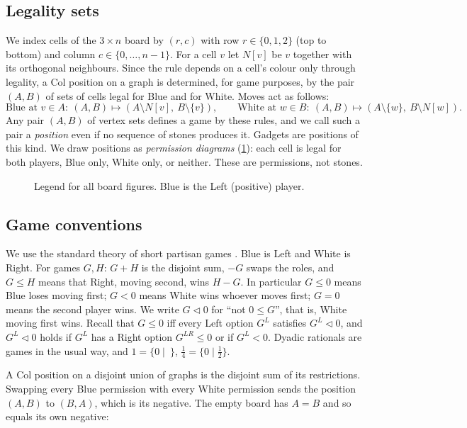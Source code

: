 \documentclass[11pt]{amsart}
\theoremstyle{definition}
\newcommand{\Nb}{N}
\newcommand{\lf}{\mathrel{\triangleleft}}
\begin{document}
\subsection{Legality sets}
We index cells of the $3\times n$ board by $(r,c)$ with row $r\in\{0,1,2\}$
(top to bottom) and column $c\in\{0,\dots,n-1\}$. For a cell $v$ let $\Nb[v]$
be $v$ together with its orthogonal neighbours. Since the rule depends on a
cell's colour only through legality, a Col position on a graph is determined,
for game purposes, by the pair $(A,B)$ of sets of cells legal for Blue and for
White. Moves act as follows:
\[
\text{Blue at }v\in A:\ (A,B)\mapsto (A\setminus \Nb[v],\ B\setminus\{v\}),\qquad
\text{White at }w\in B:\ (A,B)\mapsto (A\setminus\{w\},\ B\setminus \Nb[w]).
\]
Any pair $(A,B)$ of vertex sets defines a game by these rules, and we call such
a pair a \emph{position} even if no sequence of stones produces it. Gadgets are
positions of this kind. We draw positions as \emph{permission diagrams}
(\cref{fig:legend}): each cell is legal for both players, Blue only, White
only, or neither. These are permissions, not stones.

\begin{figure}[ht]
\centering
{}
\caption{Legend for all board figures. Blue is the Left (positive) player.}
\label{fig:legend}
\end{figure}

\subsection{Game conventions}
We use the standard theory of short partisan games \cite{ONAG,Siegel}. Blue is
Left and White is Right. For games $G,H$: $G+H$ is the disjoint sum, $-G$
swaps the roles, and $G\le H$ means that Right, moving second, wins $H-G$.
In particular $G\le0$ means Blue loses moving first; $G<0$ means White wins
whoever moves first; $G=0$ means the second player wins. We write
$G\lf 0$ for ``not $0\le G$'', that is, White moving first wins. Recall that
$G\le 0$ iff every Left option $G^L$ satisfies $G^L\lf 0$, and $G^L\lf0$ holds
if $G^L$ has a Right option $G^{LR}\le0$ or if $G^L<0$.
Dyadic rationals are games in the usual way, and $1=\{0\mid\ \}$,
$\tfrac14=\{0\mid\tfrac12\}$.

A Col position on a disjoint union of graphs is the disjoint sum of its
restrictions. Swapping every Blue permission with every White permission sends
the position $(A,B)$ to $(B,A)$, which is its negative. The empty board has
$A=B$ and so equals its own negative:
\end{document}
